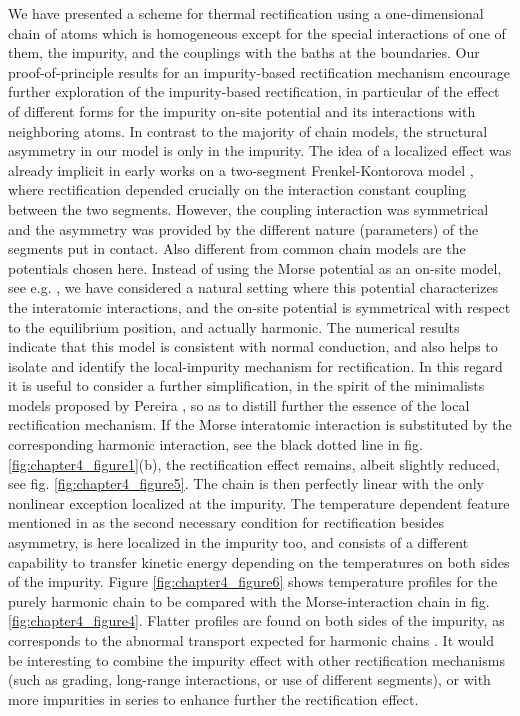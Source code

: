 We have presented  a scheme for thermal rectification using a one-dimensional chain of atoms which is homogeneous except
for the special interactions of one of them, the impurity, and the couplings with the baths at the boundaries.
Our  proof-of-principle results for an impurity-based rectification mechanism encourage further exploration of the
impurity-based rectification, in particular
of the effect of different forms for the impurity on-site potential and its interactions with neighboring atoms.
In contrast to the majority of chain models, the structural asymmetry in our model
is only in the impurity. The idea of a localized effect was already implicit in early works on a two-segment Frenkel-Kontorova
model \cite{Li2004,Hu2006}, where rectification depended crucially on the interaction constant coupling between the two segments.
However, the coupling interaction was symmetrical and the asymmetry was provided by the different nature
(parameters) of the segments put in contact.
Also different from common chain models are the potentials chosen here. Instead of using the Morse
potential as an on-site model, see e.g.  \cite{Terraneo2002},
we have considered a natural setting where this potential characterizes the interatomic interactions,
and the on-site potential is symmetrical with respect to the equilibrium position, and actually harmonic.
The numerical results indicate that this model is consistent with normal conduction,
and also helps to isolate and identify the local-impurity mechanism for rectification.
In this regard it is useful to consider a further simplification, in the spirit of the minimalists models
proposed by Pereira \cite{Pereira2017}, so as to distill further the essence of the local rectification mechanism.
If the Morse interatomic interaction is substituted by the corresponding harmonic interaction, see the black dotted line in fig. \ref{fig:chapter4_figure1}(b), the rectification effect remains, albeit slightly reduced, see fig. \ref{fig:chapter4_figure5}. The chain is then perfectly linear with the only nonlinear exception  localized
at the impurity.
The temperature dependent feature mentioned in \cite{Pereira2017} as the second necessary condition for rectification besides asymmetry, is here localized in the impurity too, and consists of a different
capability to transfer kinetic energy depending on the temperatures on both sides of the impurity.
Figure \ref{fig:chapter4_figure6} shows temperature profiles for the purely harmonic chain to be compared with the Morse-interaction
chain in fig. \ref{fig:chapter4_figure4}. Flatter profiles are found on both sides of the impurity,
as corresponds to the abnormal transport expected for harmonic chains \cite{Lepri2003}.
It would be interesting to combine the impurity effect with other rectification mechanisms (such as grading, long-range interactions, or use of different segments), or with more impurities in series to enhance further the rectification effect.


